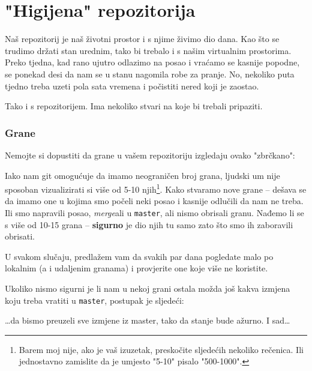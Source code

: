 \chapter*{"Higijena" repozitorija}

Naš repozitorij je naš životni prostor i s njime živimo dio dana.
Kao što se trudimo držati stan urednim, tako bi trebalo i s našim virtualnim prostorima.
Preko tjedna, kad rano ujutro odlazimo na posao i vraćamo se kasnije popodne, se ponekad desi da nam se u stanu nagomila robe za pranje.
No, nekoliko puta tjedno treba uzeti pola sata vremena i počistiti nered koji je zaostao.

Tako i s repozitorijem.
Ima nekoliko stvari na koje bi trebali pripaziti.

\subsection*{Grane}

Nemojte si dopustiti da grane u vašem repozitoriju izgledaju ovako "zbrčkano":



Iako nam git omogućuje da imamo neograničen broj grana, ljudski um nije sposoban vizualizirati si više od 5-10 njih\footnote{Barem moj nije, ako je vaš izuzetak, preskočite sljedećih nekoliko rečenica. Ili jednostavno zamislite da je umjesto "5-10" pisalo "500-1000".}.
Kako stvaramo nove grane -- dešava se da imamo one u kojima smo počeli neki posao i kasnije odlučili da nam ne treba.
Ili smo napravili posao, \emph{merge}ali u \verb+master+, ali nismo obrisali granu.
Nađemo li se s više od 10-15 grana -- \textbf{sigurno} je dio njih tu samo zato što smo ih zaboravili obrisati.

U svakom slučaju, predlažem vam da svakih par dana pogledate malo po lokalnim (a i udaljenim granama) i provjerite one koje više ne koristite.

Ukoliko nismo sigurni je li nam u nekoj grani ostala možda još kakva izmjena koju treba vratiti u \verb+master+, postupak je sljedeći:


\dots{}da bismo preuzeli sve izmjene iz master, tako da stanje bude ažurno.
I sad\dots


